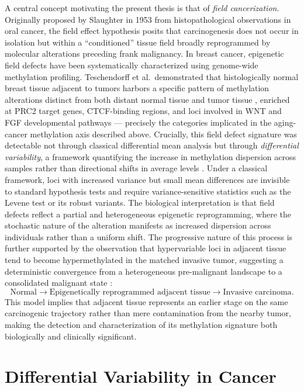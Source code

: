 A central concept motivating the present thesis is that of \textit{field
cancerization}. Originally proposed by Slaughter in 1953 from histopathological
observations in oral cancer, the field effect hypothesis posits that
carcinogenesis does not occur in isolation but within a ``conditioned'' tissue
field broadly reprogrammed by molecular alterations preceding frank malignancy.
In breast cancer, epigenetic field defects have been systematically characterized
using genome-wide methylation profiling. Teschendorff et al.\ demonstrated that
histologically normal breast tissue adjacent to tumors harbors a specific pattern
of methylation alterations distinct from both distant normal tissue and tumor
tissue \cite{Teschendorff2016}, enriched at PRC2 target genes, CTCF-binding
regions, and loci involved in WNT and FGF developmental pathways — precisely
the categories implicated in the aging-cancer methylation axis described above.
Crucially, this field defect signature was detectable not through classical
differential mean analysis but through \textit{differential variability}, a
framework quantifying the increase in methylation dispersion across samples
rather than directional shifts in average levels \cite{Teschendorff2016,Teschendorff2014}.
Under a classical framework, loci with increased variance but small mean
differences are invisible to standard hypothesis tests and require
variance-sensitive statistics such as the Levene test or its robust variants.
The biological interpretation is that field defects reflect a partial and
heterogeneous epigenetic reprogramming, where the stochastic nature of the
alteration manifests as increased dispersion across individuals rather than
a uniform shift.
The progressive nature of this process is further supported by the observation
that hypervariable loci in adjacent tissue tend to become hypermethylated in
the matched invasive tumor, suggesting a deterministic convergence from a
heterogeneous pre-malignant landscape to a consolidated malignant state
\cite{Teschendorff2016}:
\[
\text{Normal} \rightarrow
\text{Epigenetically reprogrammed adjacent tissue} \rightarrow
\text{Invasive carcinoma}.
\]
This model implies that adjacent tissue represents an earlier stage on the
same carcinogenic trajectory rather than mere contamination from the nearby
tumor, making the detection and characterization of its methylation signature
both biologically and clinically significant.

\section{Differential Variability in Cancer}

